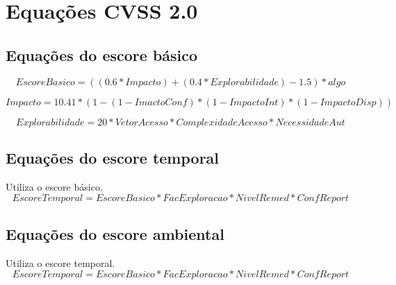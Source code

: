 
\chapter{Equações CVSS 2.0}
\label{chap:equacoes_cvss}


	\section{Equações do escore básico}
		\begin{equation}
			\label{eq:basica}
			EscoreBasico = ((0.6 * Impacto)+(0.4 * Explorabilidade) - 1.5)*algo
		\end{equation}

		\begin{equation}
			\label{eq:impacto}
			Impacto = 10.41 * (1-(1-ImactoConf) * (1-ImpactoInt) * (1-ImpactoDisp))
		\end{equation}

		\begin{equation}
			\label{eq:explorabilidade}
			Explorabilidade = 20 * VetorAcesso * ComplexidadeAcesso * NecessidadeAut
		\end{equation}

	\section{Equações do escore temporal}
		Utiliza o escore básico.
		\begin{equation}
			\label{eq:temporal}
			EscoreTemporal = EscoreBasico * FacExploracao * NivelRemed * ConfReport
		\end{equation}

	\section{Equações do escore ambiental}
	Utiliza o escore temporal.
		\begin{equation}
			\label{eq:ambiental}
			EscoreTemporal = EscoreBasico * FacExploracao * NivelRemed * ConfReport
		\end{equation}
	

